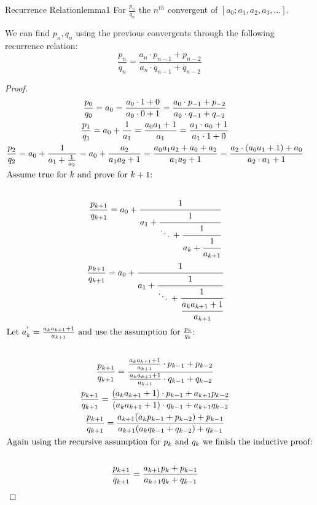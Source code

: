 \documentclass[a4paper]{article}
\begin{document}
\begin{mylemma}{Recurrence Relation}{lemma1}
  For $\frac{p_{n}}{q_n}$ the $n^{th}$ convergent of $[a_0; a_1, a_2, a_3, \dots]$.

  We can find $p_n, q_n$ using the previous convergents through the following recurrence relation:
  \[
    \frac{p_{n}}{q_n} = \frac{a_n \cdot p_{n-1} + p_{n-2}}{a_n \cdot q_{n-1} + q_{n-2}}
  \]

  \begin{proof}
    \begin{gather*}
      \frac{p_{0}}{q_0} = a_0 = \frac{a_0 \cdot 1 + 0}{a_0 \cdot 0 + 1}
      = \frac{a_0 \cdot p_{-1} + p_{-2}}{a_0 \cdot q_{-1} + q_{-2}} \\
      \frac{p_{1}}{q_1} = a_0 + \frac{1}{a_1} = \frac{a_{0} a_{1} + 1}{a_1}
      = \frac{a_1 \cdot a_0 + 1}{a_1 \cdot 1 + 0} \\
      \frac{p_{2}}{q_2} = a_0 + \frac{1}{a_1 + \frac{1}{a_2}} = a_0 + \frac{a_2}{a_1 a_2 + 1}
      = \frac{a_{0} a_{1} a_2 + a_0 + a_2}{a_1 a_2 + 1}
      = \frac{a_2 \cdot (a_0 a_1 + 1) + a_0}{a_2 \cdot a_1 + 1} \\
      \shortintertext{Assume true for \( k \)  and prove for  \( k+1 \):} \\
      \frac{p_{k+1}}{q_{k+1}} = a_0 + \cfrac{1}{a_1 + \cfrac{1}{\ddots \, + \cfrac{1}{a_{k} + \cfrac{1}{a_{k+1}} }}} \\
      \frac{p_{k+1}}{q_{k+1}} = a_0 + \cfrac{1}{a_1 + \cfrac{1}{\ddots \, + \cfrac{1}{\cfrac{a_{k} a_{k+1} + 1}{a_{k+1}} }}} \\
      \shortintertext{Let \( a_{k}^{'} = \frac{a_{k} a_{k+1} + 1}{a_{k+1}} \)  and use the assumption for \( \frac{p_k}{q_k} \):} \\
      \frac{p_{k+1}}{q_{k+1}} = \frac{\frac{a_{k} a_{k+1} + 1}{a_{k+1}} \cdot p_{k-1} + p_{k-2}}{\frac{a_{k} a_{k+1} + 1}{a_{k+1}} \cdot q_{k-1} + q_{k-2}}  \\
      \frac{p_{k+1}}{q_{k+1}} = \frac{(a_{k} a_{k+1} + 1) \cdot p_{k-1} + a_{k+1} p_{k-2} }{(a_{k} a_{k+1} + 1) \cdot q_{k-1} + a_{k+1} q_{k-2}}  \\
      \frac{p_{k+1}}{q_{k+1}} = \frac{a_{k+1} (a_{k}  p_{k-1} + p_{k-2}) + p_{k-1}}{a_{k+1} (a_{k} q_{k-1} + q_{k-2})  + q_{k-1}}  \\
      \shortintertext{Again using the recursive assumption for \( p_k \) and \( q_k \)  we finish the inductive proof:} \\
      \frac{p_{k+1}}{q_{k+1}} = \frac{a_{k+1} p_{k} + p_{k-1}}{a_{k+1} q_{k}  + q_{k-1}}
    \end{gather*}
  \end{proof}
\end{mylemma}
\end{document}
